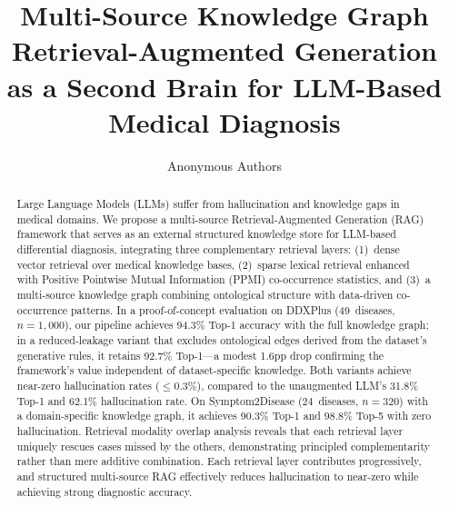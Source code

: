 \documentclass[runningheads]{llncs}
\begin{document}
\title{Multi-Source Knowledge Graph Retrieval-Augmented Generation as a Second Brain for LLM-Based Medical Diagnosis}


\author{Anonymous Authors}

\maketitle

\begin{abstract}
Large Language Models (LLMs) suffer from hallucination and knowledge gaps in medical domains. We propose a multi-source Retrieval-Augmented Generation (RAG) framework that serves as an external structured knowledge store for LLM-based differential diagnosis, integrating three complementary retrieval layers: (1)~dense vector retrieval over medical knowledge bases, (2)~sparse lexical retrieval enhanced with Positive Pointwise Mutual Information (PPMI) co-occurrence statistics, and (3)~a multi-source knowledge graph combining ontological structure with data-driven co-occurrence patterns. In a proof-of-concept evaluation on DDXPlus (49~diseases, $n{=}1{,}000$), our pipeline achieves 94.3\% Top-1 accuracy with the full knowledge graph; in a reduced-leakage variant that excludes ontological edges derived from the dataset's generative rules, it retains 92.7\% Top-1---a modest 1.6pp drop confirming the framework's value independent of dataset-specific knowledge. Both variants achieve near-zero hallucination rates ($\leq$0.3\%), compared to the unaugmented LLM's 31.8\% Top-1 and 62.1\% hallucination rate. On Symptom2Disease (24~diseases, $n{=}320$) with a domain-specific knowledge graph, it achieves 90.3\% Top-1 and 98.8\% Top-5 with zero hallucination. Retrieval modality overlap analysis reveals that each retrieval layer uniquely rescues cases missed by the others, demonstrating principled complementarity rather than mere additive combination. Each retrieval layer contributes progressively, and structured multi-source RAG effectively reduces hallucination to near-zero while achieving strong diagnostic accuracy.

\end{abstract}

\end{document}
